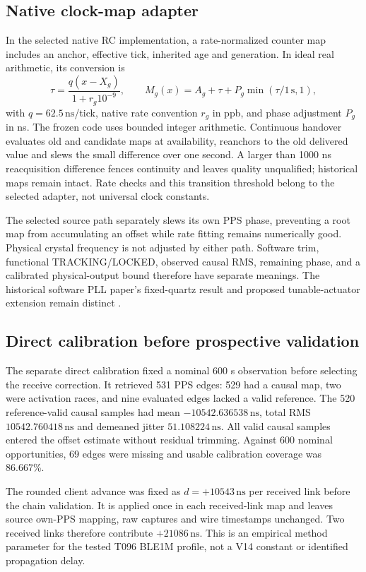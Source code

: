 \documentclass[11pt,letterpaper]{article}
\newcommand{\ns}{\,\mathrm{ns}}\newcommand{\us}{\,\mu\mathrm{s}}\newcommand{\ms}{\,\mathrm{ms}}\newcommand{\ppb}{\,\mathrm{ppb}}\newcommand{\code}[1]{\texttt{#1}}\newcolumntype{L}[1]{>{\RaggedRight\arraybackslash}p{#1}}
\begin{document}
\subsection{Native clock-map adapter}
In the selected native RC implementation, a rate-normalized counter map includes an anchor, effective tick, inherited age and generation. In ideal real arithmetic, its conversion is
\begin{equation}
 \tau=\frac{q(x-X_g)}{1+r_g10^{-9}},\qquad
 M_g(x)=A_g+\tau+P_g\min(\tau/1\,\mathrm{s},1),\label{eq:rcmap}
\end{equation}
with $q=62.5\ns$/tick, native rate convention $r_g$ in ppb, and phase adjustment $P_g$ in ns. The frozen code uses bounded integer arithmetic. Continuous handover evaluates old and candidate maps at availability, reanchors to the old delivered value and slews the small difference over one second. A larger than 1000 ns reacquisition difference fences continuity and leaves quality unqualified; historical maps remain intact. Rate checks and this transition threshold belong to the selected adapter, not universal clock constants.

The selected source path separately slews its own PPS phase, preventing a root map from accumulating an offset while rate fitting remains numerically good. Physical crystal frequency is not adjusted by either path. Software trim, functional TRACKING/LOCKED, observed causal RMS, remaining phase, and a calibrated physical-output bound therefore have separate meanings. The historical software PLL paper's fixed-quartz result and proposed tunable-actuator extension remain distinct \cite{oscprior}.

\subsection{Direct calibration before prospective validation}
The separate direct calibration fixed a nominal 600 s observation before selecting the receive correction. It retrieved 531 PPS edges: 529 had a causal map, two were activation races, and nine evaluated edges lacked a valid reference. The 520 reference-valid causal samples had mean $-10542.636538\ns$, total RMS $10542.760418\ns$ and demeaned jitter $51.108224\ns$. All valid causal samples entered the offset estimate without residual trimming. Against 600 nominal opportunities, 69 edges were missing and usable calibration coverage was 86.667\%.

The rounded client advance was fixed as $d=+10543\ns$ per received link before the chain validation. It is applied once in each received-link map and leaves source own-PPS mapping, raw captures and wire timestamps unchanged. Two received links therefore contribute $+21086\ns$. This is an empirical method parameter for the tested T096 BLE1M profile, not a V14 constant or identified propagation delay.
\end{document}
